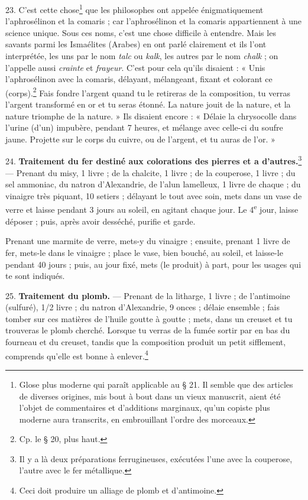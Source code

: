\documentclass[a4paper, 11pt, oneside, polutonikogreek, french]{article}
\begin{document}
23. C'est cette chose\footnote{Glose plus moderne qui paraît applicable au § 21. Il semble que des articles de diverses origines, mis bout à bout dans un vieux manuscrit, aient été l'objet de commentaires et d'additions marginaux, qu'un copiste plus moderne aura transcrits, en embrouillant l'ordre des morceaux.} que les philosophes ont appelée énigmatiquement l'aphrosélinon et la comaris ; car l'aphrosélinon et la comaris appartiennent à une science unique. Sous ces noms, c'est une chose difficile à entendre. Mais les savants parmi les Ismaélites (Arabes) en ont parlé clairement et ils l'ont interprétée, les uns par le nom \emph{talc} ou \emph{kalk}, les autres par le nom \emph{chalk} ; on l'appelle aussi \emph{crainte} et \emph{frayeur}. C'est pour cela qu'ils disaient : « Unis l'aphrosélinon avec la comaris, délayant, mélangeant, fixant et colorant ce (corps).\footnote{Cp. le § 20, plus haut.} Fais fondre l'argent quand tu le retireras de la composition, tu verras l'argent transformé en or et tu seras étonné. La nature jouit de la nature, et la nature triomphe de la nature. » Ils disaient encore : « Délaie la chrysocolle dans l'urine (d'un) impubère, pendant 7 heures, et mélange avec celle-ci du soufre jaune. Projette sur le corps du cuivre, ou de l'argent, et tu auras de l'or. »

24. \textbf{Traitement du fer destiné aux colorations des pierres et a d'autres.}\footnote{Il y a là deux préparations ferrugineuses, exécutées l'une avec la couperose, l'autre avec le fer métallique.} --- Prenant du misy, 1 livre ; de la chalcite, 1 livre ; de la couperose, 1 livre ; du sel ammoniac, du natron d'Alexandrie, de l'alun lamelleux, 1 livre de chaque ; du vinaigre très piquant, 10 setiers ; délayant le tout avec soin, mets dans un vase de verre et laisse pendant 3 jours au soleil, en agitant chaque jour. Le 4\textsuperscript{e} jour, laisse déposer ; puis, après avoir desséché, purifie et garde.

Prenant une marmite de verre, mets-y du vinaigre ; ensuite, prenant 1 livre de fer, mets-le dans le vinaigre ; place le vase, bien bouché, au soleil, et laisse-le pendant 40 jours ; puis, au jour fixé, mets (le produit) à part, pour les usages qui te sont indiqués.

25. \textbf{Traitement du plomb.} --- Prenant de la litharge, 1 livre ; de l'antimoine (sulfuré), 1/2 livre ; du natron d'Alexandrie, 9 onces ; délaie ensemble ; fais tomber sur ces matières de l'huile goutte à goutte ; mets, dans un creuset et tu trouveras le plomb cherché. Lorsque tu verras de la fumée sortir par en bas du fourneau et du creuset, tandis que la composition produit un petit sifflement, comprends qu'elle est bonne à enlever.\footnote{Ceci doit produire un alliage de plomb et d'antimoine.}
\end{document}
